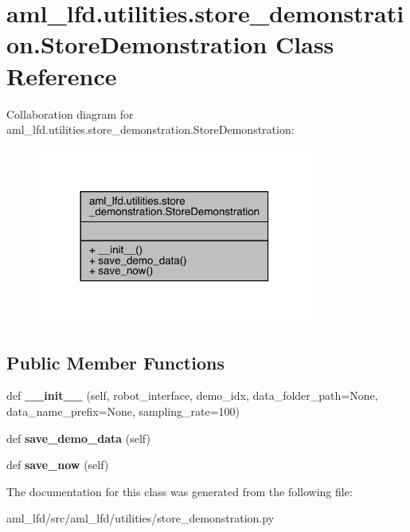 \hypertarget{classaml__lfd_1_1utilities_1_1store__demonstration_1_1_store_demonstration}{}\section{aml\+\_\+lfd.\+utilities.\+store\+\_\+demonstration.\+Store\+Demonstration Class Reference}
\label{classaml__lfd_1_1utilities_1_1store__demonstration_1_1_store_demonstration}


Collaboration diagram for aml\+\_\+lfd.\+utilities.\+store\+\_\+demonstration.\+Store\+Demonstration\+:\nopagebreak
\begin{figure}[H]
\begin{center}
\leavevmode
\includegraphics[width=257pt]{classaml__lfd_1_1utilities_1_1store__demonstration_1_1_store_demonstration__coll__graph}
\end{center}
\end{figure}
\subsection*{Public Member Functions}
\begin{DoxyCompactItemize}
\item 
\hypertarget{classaml__lfd_1_1utilities_1_1store__demonstration_1_1_store_demonstration_a345e5cbedf84f759586e600b60a8bc81}{}\label{classaml__lfd_1_1utilities_1_1store__demonstration_1_1_store_demonstration_a345e5cbedf84f759586e600b60a8bc81} 
def {\bfseries \+\_\+\+\_\+init\+\_\+\+\_\+} (self, robot\+\_\+interface, demo\+\_\+idx, data\+\_\+folder\+\_\+path=None, data\+\_\+name\+\_\+prefix=None, sampling\+\_\+rate=100)
\item 
\hypertarget{classaml__lfd_1_1utilities_1_1store__demonstration_1_1_store_demonstration_af712a5bc7ae0793a53700c1f123aaf5f}{}\label{classaml__lfd_1_1utilities_1_1store__demonstration_1_1_store_demonstration_af712a5bc7ae0793a53700c1f123aaf5f} 
def {\bfseries save\+\_\+demo\+\_\+data} (self)
\item 
\hypertarget{classaml__lfd_1_1utilities_1_1store__demonstration_1_1_store_demonstration_a626e68dbd7e29a25ca5f3d0496592884}{}\label{classaml__lfd_1_1utilities_1_1store__demonstration_1_1_store_demonstration_a626e68dbd7e29a25ca5f3d0496592884} 
def {\bfseries save\+\_\+now} (self)
\end{DoxyCompactItemize}


The documentation for this class was generated from the following file\+:\begin{DoxyCompactItemize}
\item 
aml\+\_\+lfd/src/aml\+\_\+lfd/utilities/store\+\_\+demonstration.\+py\end{DoxyCompactItemize}
